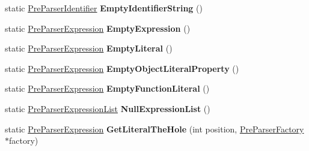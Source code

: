 \begin{DoxyCompactItemize}
\item 
static \hyperlink{classv8_1_1internal_1_1_pre_parser_identifier}{Pre\+Parser\+Identifier} {\bfseries Empty\+Identifier\+String} ()\hypertarget{classv8_1_1internal_1_1_pre_parser_traits_a84debed7c42d79a6179c14ad5ead6304}{}\label{classv8_1_1internal_1_1_pre_parser_traits_a84debed7c42d79a6179c14ad5ead6304}

\item 
static \hyperlink{classv8_1_1internal_1_1_pre_parser_expression}{Pre\+Parser\+Expression} {\bfseries Empty\+Expression} ()\hypertarget{classv8_1_1internal_1_1_pre_parser_traits_aa87841c51f003fe9b8c020a49ddfe672}{}\label{classv8_1_1internal_1_1_pre_parser_traits_aa87841c51f003fe9b8c020a49ddfe672}

\item 
static \hyperlink{classv8_1_1internal_1_1_pre_parser_expression}{Pre\+Parser\+Expression} {\bfseries Empty\+Literal} ()\hypertarget{classv8_1_1internal_1_1_pre_parser_traits_a00363fbe43336e636176910c3c87f348}{}\label{classv8_1_1internal_1_1_pre_parser_traits_a00363fbe43336e636176910c3c87f348}

\item 
static \hyperlink{classv8_1_1internal_1_1_pre_parser_expression}{Pre\+Parser\+Expression} {\bfseries Empty\+Object\+Literal\+Property} ()\hypertarget{classv8_1_1internal_1_1_pre_parser_traits_a853b9e90c5f0b0be06ac229d72b42a83}{}\label{classv8_1_1internal_1_1_pre_parser_traits_a853b9e90c5f0b0be06ac229d72b42a83}

\item 
static \hyperlink{classv8_1_1internal_1_1_pre_parser_expression}{Pre\+Parser\+Expression} {\bfseries Empty\+Function\+Literal} ()\hypertarget{classv8_1_1internal_1_1_pre_parser_traits_a9be9694a42e9a35122c31a8fed078f0c}{}\label{classv8_1_1internal_1_1_pre_parser_traits_a9be9694a42e9a35122c31a8fed078f0c}

\item 
static \hyperlink{classv8_1_1internal_1_1_pre_parser_list}{Pre\+Parser\+Expression\+List} {\bfseries Null\+Expression\+List} ()\hypertarget{classv8_1_1internal_1_1_pre_parser_traits_ab9e866cd9f5e668838fbd12546a1a5fe}{}\label{classv8_1_1internal_1_1_pre_parser_traits_ab9e866cd9f5e668838fbd12546a1a5fe}

\item 
static \hyperlink{classv8_1_1internal_1_1_pre_parser_expression}{Pre\+Parser\+Expression} {\bfseries Get\+Literal\+The\+Hole} (int position, \hyperlink{classv8_1_1internal_1_1_pre_parser_factory}{Pre\+Parser\+Factory} $\ast$factory)\hypertarget{classv8_1_1internal_1_1_pre_parser_traits_a8d1bf1dc2bbcb07c3e965aecab84d66c}{}\label{classv8_1_1internal_1_1_pre_parser_traits_a8d1bf1dc2bbcb07c3e965aecab84d66c}


\end{DoxyCompactItemize}

